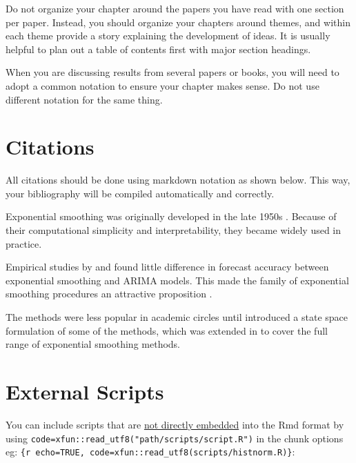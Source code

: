 \documentclass[honours,12pt,twoside]{unswthesis}
\numberwithin{equation}{section}
\begin{document}
Do not organize your chapter around the papers you have read with one section per paper. Instead, you should organize your chapters around themes, and within each theme provide a story explaining the development of ideas. It is usually helpful to plan out a table of contents first with major section headings.

When you are discussing results from several papers or books, you will need to adopt a common notation to ensure your chapter makes sense. Do not use different notation for the same thing.

\hypertarget{citations}{%
\section{Citations}\label{citations}}

All citations should be done using markdown notation as shown below. This way, your bibliography will be compiled automatically and correctly.

Exponential smoothing was originally developed in the late 1950s \autocite{Brown59,Brown63,Holt57,Winters60}. Because of their computational simplicity and interpretability, they became widely used in practice.

Empirical studies by \textcite{MH79} and \textcite{Metal82} found little difference in forecast accuracy between exponential smoothing and ARIMA models. This made the family of exponential smoothing procedures an attractive proposition \autocite[see][]{CKOS01}.

The methods were less popular in academic circles until \textcite{OKS97} introduced a state space formulation of some of the methods, which was extended in \textcite{HKSG02} to cover the full range of exponential smoothing methods.

\hypertarget{external-scripts}{%
\section{External Scripts}\label{external-scripts}}

You can include scripts that are \href{https://bookdown.org/yihui/rmarkdown-cookbook/option-code.html}{not directly embedded}
into the Rmd format
by using \texttt{code=xfun::read\_utf8("path/scripts/script.R")} in the chunk options eg:
\texttt{\{r\ echo=TRUE,\ code=xfun::read\_utf8(\textquotesingle{}scripts/histnorm.R\textquotesingle{})\}}:

\begin{Shaded}
\begin{Highlighting}[]

\OtherTok{\textless{}{-}} \NormalTok{(}\NormalTok{)}

\end{Highlighting}
\end{Shaded}
\end{document}
